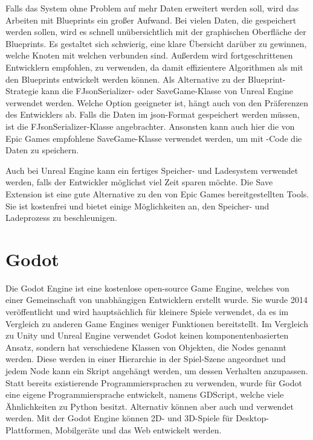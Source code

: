 Falls das System ohne Problem auf mehr Daten erweitert werden soll, wird das Arbeiten mit Blueprints ein großer Aufwand. Bei vielen Daten, die gespeichert werden sollen, wird es schnell unübersichtlich mit der graphischen Oberfläche der Blueprints. Es gestaltet sich schwierig, eine klare Übersicht darüber zu gewinnen, welche Knoten mit welchen verbunden sind. Außerdem wird fortgeschrittenen Entwicklern empfohlen, \cpp{} zu verwenden, da damit effizientere Algorithmen als mit den Blueprints entwickelt werden können.\cite{epicgamesComparingBlueprints} Als Alternative zu der Blueprint-Strategie kann die FJsonSerializer- oder SaveGame-Klasse von Unreal Engine verwendet werden. Welche Option geeigneter ist, hängt auch von den Präferenzen des Entwicklers ab. Falls die Daten im \ac{json}-Format gespeichert werden müssen, ist die FJsonSerializer-Klasse angebrachter. Ansonsten kann auch hier die von Epic Games empfohlene SaveGame-Klasse verwendet werden, um mit \cpp{}-Code die Daten zu speichern.

Auch bei Unreal Engine kann ein fertiges Speicher- und Ladesystem verwendet werden, falls der Entwickler möglichst viel Zeit sparen möchte. Die Save Extension ist eine gute Alternative zu den von Epic Games bereitgestellten Tools. Sie ist kostenfrei und bietet einige Möglichkeiten an, den Speicher- und Ladeprozess zu beschleunigen. 



\section{Godot}
Die Godot Engine ist eine kostenlose open-source Game Engine, welches von einer Gemeinschaft von unabhängigen Entwicklern erstellt wurde. Sie wurde 2014 veröffentlicht und wird hauptsächlich für kleinere Spiele verwendet, da es im Vergleich zu anderen Game Engines weniger Funktionen bereitstellt. Im Vergleich zu Unity und Unreal Engine verwendet Godot keinen komponentenbasierten Ansatz, sondern hat verschiedene Klassen von Objekten, die Nodes genannt werden. Diese werden in einer Hierarchie in der Spiel-Szene angeordnet und jedem Node kann ein Skript angehängt werden, um dessen Verhalten anzupassen. Statt bereits existierende Programmiersprachen zu verwenden, wurde für Godot eine eigene Programmiersprache entwickelt, namens GDScript, welche viele Ähnlichkeiten zu Python besitzt. Alternativ können aber auch \csharp{} und \cpp{} verwendet werden. Mit der Godot Engine können 2D- und 3D-Spiele für Desktop-Plattformen, Mobilgeräte und das Web entwickelt werden.\cite{salmela2022game}

